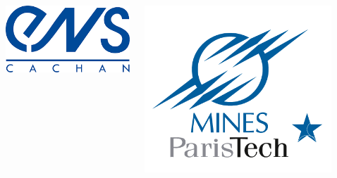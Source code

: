 \documentclass[11pt,xcolor=dvipsnames]{beamer}
\begin{document}
\begin{frame}
\begin{overlayarea}{12cm}{4cm}
{\begin{columns}
\begin{column}{0.12\linewidth}
\end{column}
\begin{column}{0.12\linewidth}
\includegraphics[width=0.9\linewidth]{images/ens_cachan.png}
\end{column}
\begin{column}{0.12\linewidth}
\includegraphics[width=0.9\linewidth]{images/ecole_des_mines.png}
\end{column}
\begin{column}{0.12\linewidth}

\end{column}
\end{columns}}
\end{overlayarea}
\end{frame}
\end{document}
